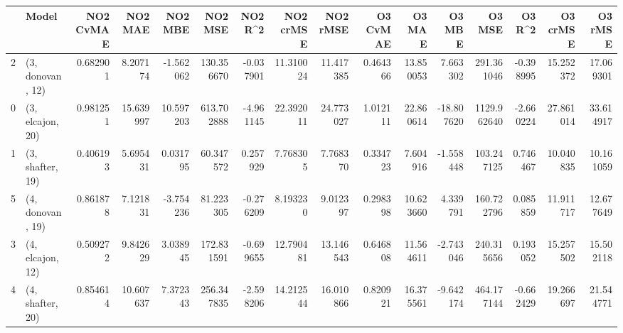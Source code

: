 \begin{tabular}{llrrrrrrrrrrrrrr}
\toprule
{} &             Model &  NO2 CvMAE &    NO2 MAE &    NO2 MBE &     NO2 MSE &   NO2 R\textasciicircum2 &  NO2 crMSE &   NO2 rMSE &  O3 CvMAE &     O3 MAE &     O3 MBE &       O3 MSE &    O3 R\textasciicircum2 &   O3 crMSE &    O3 rMSE \\
\midrule
2 &  (3, donovan, 12) &   0.682901 &   8.207174 &  -1.562062 &  130.356670 & -0.037901 &  11.310024 &  11.417385 &  0.464366 &  13.850053 &   7.663302 &   291.361046 & -0.398995 &  15.252372 &  17.069301 \\
0 &  (3, elcajon, 20) &   0.981251 &  15.639997 &  10.597203 &  613.702888 & -4.961145 &  22.392011 &  24.773027 &  1.012111 &  22.860614 & -18.807620 &  1129.962640 & -2.660224 &  27.861014 &  33.614917 \\
1 &  (3, shafter, 19) &   0.406193 &   5.695431 &   0.031795 &   60.347572 &  0.257929 &   7.768305 &   7.768370 &  0.334723 &   7.604916 &  -1.558448 &   103.247125 &  0.746467 &  10.040835 &  10.161059 \\
5 &  (4, donovan, 19) &   0.861878 &   7.121831 &  -3.754236 &   81.223305 & -0.276209 &   8.193230 &   9.012397 &  0.298398 &  10.623660 &   4.339791 &   160.722796 &  0.085859 &  11.911717 &  12.677649 \\
3 &  (4, elcajon, 12) &   0.509272 &   9.842629 &   3.038945 &  172.831591 & -0.699655 &  12.790481 &  13.146543 &  0.646808 &  11.564611 &  -2.743046 &   240.315656 &  0.193052 &  15.257502 &  15.502118 \\
4 &  (4, shafter, 20) &   0.854614 &  10.607637 &   7.372343 &  256.347835 & -2.598206 &  14.212544 &  16.010866 &  0.820921 &  16.375561 &  -9.642174 &   464.177144 & -0.662429 &  19.266697 &  21.544771 \\
\bottomrule
\end{tabular}
